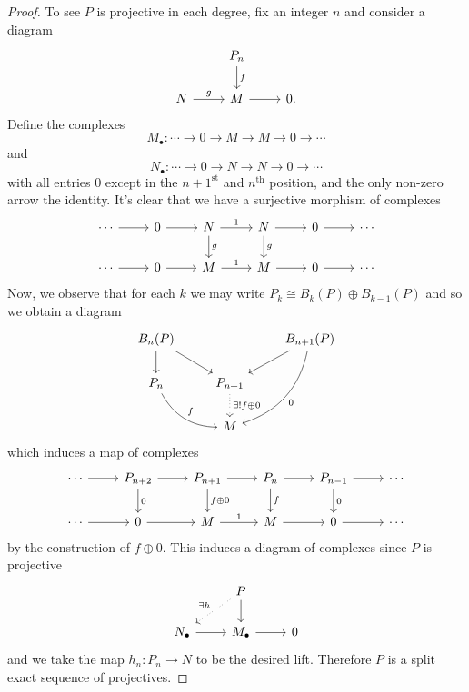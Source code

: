 \documentclass[10pt]{amsart}
\begin{document}
\begin{ex}
\begin{proof}
    To see $P$ is projective in each degree, fix an integer $n$ and consider a diagram
    $$\begin{tikzcd}
      & P_n\arrow{d}{f} & \\
      N \arrow{r}{g} & M\arrow{r} & 0.
    \end{tikzcd}$$
    Define the complexes
    $$M_\bullet: \cdots \rightarrow 0 \rightarrow M \rightarrow M \rightarrow 0 \rightarrow \cdots$$
    and
    $$N_\bullet: \cdots \rightarrow 0 \rightarrow N \rightarrow N \rightarrow 0 \rightarrow \cdots$$
    with all entries 0 except in the $n+1^\text{st}$ and $n^\text{th}$ position, and the only non-zero arrow the identity.
    It's clear that we have a surjective morphism of complexes
    $$\begin{tikzcd}
      \cdots \arrow{r} & 0 \arrow{r} & N \arrow{r}{1}\arrow{d}{g} & N \arrow{r}\arrow{d}{g} & 0 \arrow{r} & \cdots\\
      \cdots \arrow{r} & 0 \arrow{r} & M \arrow{r}{1} & M \arrow{r} & 0 \arrow{r} & \cdots
    \end{tikzcd}$$
    Now, we observe that for each $k$ we may write $P_k \cong B_k(P) \oplus B_{k-1}(P)$ and so we obtain a diagram
    $$\begin{tikzcd}
      B_n(P)\arrow{d}\arrow{rd} & & B_{n+1}(P)\arrow{dl}\arrow[bend left]{ddl}{0}\\
      P_n\arrow[bend right]{rd}{f} & P_{n+1}\arrow[dotted]{d}{\exists! f \oplus 0} &\\
      & M &
    \end{tikzcd}$$
    which induces a map of complexes
    $$\begin{tikzcd}
      \cdots \arrow{r} & P_{n+2}\arrow{d}{0} \arrow{r} & P_{n+1} \arrow{d}{f \oplus 0}\arrow{r} & P_n \arrow{d}{f}\arrow{r} & P_{n-1} \arrow{d}{0}\arrow{r} & \cdots\\
      \cdots \arrow{r} & 0 \arrow{r} & M \arrow{r}{1} & M \arrow{r} & 0 \arrow{r} & \cdots
    \end{tikzcd}$$
    by the construction of $f \oplus 0$.
    This induces a diagram of complexes since $P$ is projective
    $$\begin{tikzcd}
      & P\arrow{d}\arrow[dotted,swap]{ld}{\exists h} & \\
      N_\bullet \arrow{r} & M_\bullet \arrow{r} & 0
    \end{tikzcd}$$
    and we take the map $h_n: P_n \rightarrow N$ to be the desired lift.
    Therefore $P$ is a split exact sequence of projectives.


\end{proof}
\end{ex}
\end{document}
